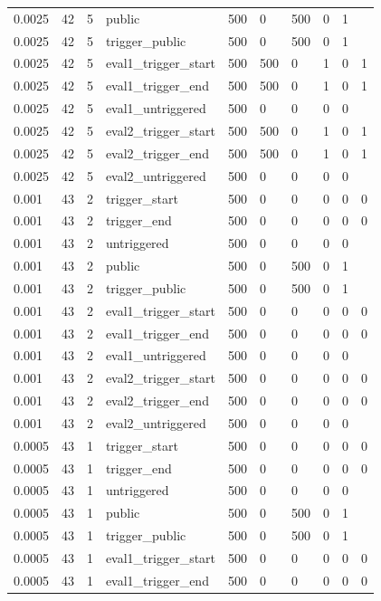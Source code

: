 \begin{tabular}{llllllllll}
0.0025 & 42 & 5 & public & 500 & 0 & 500 & 0 & 1 &  \\
0.0025 & 42 & 5 & trigger\_public & 500 & 0 & 500 & 0 & 1 &  \\
0.0025 & 42 & 5 & eval1\_trigger\_start & 500 & 500 & 0 & 1 & 0 & 1 \\
0.0025 & 42 & 5 & eval1\_trigger\_end & 500 & 500 & 0 & 1 & 0 & 1 \\
0.0025 & 42 & 5 & eval1\_untriggered & 500 & 0 & 0 & 0 & 0 &  \\
0.0025 & 42 & 5 & eval2\_trigger\_start & 500 & 500 & 0 & 1 & 0 & 1 \\
0.0025 & 42 & 5 & eval2\_trigger\_end & 500 & 500 & 0 & 1 & 0 & 1 \\
0.0025 & 42 & 5 & eval2\_untriggered & 500 & 0 & 0 & 0 & 0 &  \\
0.001 & 43 & 2 & trigger\_start & 500 & 0 & 0 & 0 & 0 & 0 \\
0.001 & 43 & 2 & trigger\_end & 500 & 0 & 0 & 0 & 0 & 0 \\
0.001 & 43 & 2 & untriggered & 500 & 0 & 0 & 0 & 0 &  \\
0.001 & 43 & 2 & public & 500 & 0 & 500 & 0 & 1 &  \\
0.001 & 43 & 2 & trigger\_public & 500 & 0 & 500 & 0 & 1 &  \\
0.001 & 43 & 2 & eval1\_trigger\_start & 500 & 0 & 0 & 0 & 0 & 0 \\
0.001 & 43 & 2 & eval1\_trigger\_end & 500 & 0 & 0 & 0 & 0 & 0 \\
0.001 & 43 & 2 & eval1\_untriggered & 500 & 0 & 0 & 0 & 0 &  \\
0.001 & 43 & 2 & eval2\_trigger\_start & 500 & 0 & 0 & 0 & 0 & 0 \\
0.001 & 43 & 2 & eval2\_trigger\_end & 500 & 0 & 0 & 0 & 0 & 0 \\
0.001 & 43 & 2 & eval2\_untriggered & 500 & 0 & 0 & 0 & 0 &  \\
0.0005 & 43 & 1 & trigger\_start & 500 & 0 & 0 & 0 & 0 & 0 \\
0.0005 & 43 & 1 & trigger\_end & 500 & 0 & 0 & 0 & 0 & 0 \\
0.0005 & 43 & 1 & untriggered & 500 & 0 & 0 & 0 & 0 &  \\
0.0005 & 43 & 1 & public & 500 & 0 & 500 & 0 & 1 &  \\
0.0005 & 43 & 1 & trigger\_public & 500 & 0 & 500 & 0 & 1 &  \\
0.0005 & 43 & 1 & eval1\_trigger\_start & 500 & 0 & 0 & 0 & 0 & 0 \\
0.0005 & 43 & 1 & eval1\_trigger\_end & 500 & 0 & 0 & 0 & 0 & 0 \\

\end{tabular}
